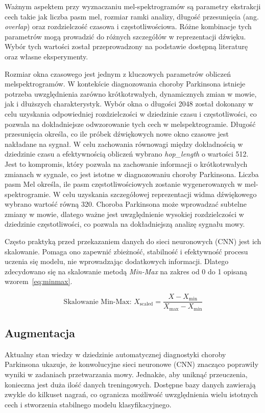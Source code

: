 Ważnym aspektem przy wyznaczaniu mel-spektrogramów są parametry ekstrakcji cech takie jak liczba pasm mel, rozmiar ramki analizy, długość przesunięcia (ang. \emph{overlap}) oraz rozdzielczość czasowa i częstotliwościowa.
Różne kombinacje tych parametrów mogą prowadzić do różnych szczegółów w reprezentacji dźwięku.
Wybór tych wartości został przeprowadzony na podstawie dostępną literaturę oraz własne eksperymenty.

Rozmiar okna czasowego jest jednym z kluczowych parametrów obliczeń melspektrogramów.
W kontekście diagnozowania choroby Parkinsona istnieje potrzeba uwzględnienia zarówno krótkotrwałych, dynamicznych zmian w mowie, jak i dłuższych charakterystyk.
Wybór okna o długości 2048 został dokonany w celu uzyskania odpowiedniej rozdzielczości w dziedzinie czasu i częstotliwości, co pozwala na dokładniejsze odwzorowanie tych cech w melspektrogramie.
Długość przesunięcia określa, co ile próbek dźwiękowych nowe okno czasowe jest nakładane na sygnał.
W celu zachowania równowagi między dokładnością w dziedzinie czasu a efektywnością obliczeń wybrano \emph{hop\_length} o wartości 512.
Jest to kompromis, który pozwala na zachowanie informacji o krótkotrwałych zmianach w sygnale, co jest istotne w diagnozowaniu choroby Parkinsona.
Liczba pasm Mel określa, ile pasm częstotliwościowych zostanie wygenerowanych w mel-spektrogramie.
W celu uzyskania szczegółowej reprezentacji widma dźwiękowego wybrano wartość równą 320.
Choroba Parkinsona może wprowadzać subtelne zmiany w mowie, dlatego ważne jest uwzględnienie wysokiej rozdzielczości w dziedzinie częstotliwości, co pozwala na dokładniejszą analizę sygnału mowy.


Często praktyką przed przekazaniem danych do sieci neuronowych (CNN) jest ich skalowanie.
Pomaga ono zapewnić zbieżność, stabilność i efektywność procesu uczenia się modelu, nie wprowadzając dodatkowych informacji.
Dlatego zdecydowano się na skalowanie metodą \emph{Min-Max}  na zakres od 0 do 1 opisaną wzorem~\eqref{eq:minmax}.

\begin{equation}
	\label{eq:minmax}
	\text{Skalowanie Min-Max: } X_{\text{scaled}} = \frac{X - X_{\min}}{X_{\max} - X_{\min}}
\end{equation}

\subsection{Augmentacja}
\label{subsec:augmentacja}

Aktualny stan wiedzy w dziedzinie automatycznej diagnostyki choroby Parkinsona ukazuje, że konwolucyjne sieci neuronowe (CNN) znacząco poprawiły wyniki w zadaniach przetwarzania mowy.
Jednakże, aby uniknąć przeuczenia, konieczna jest duża ilość danych treningowych.
Dostępne bazy danych zawierają zwykle do kilkuset nagrań, co ogranicza możliwość uwzględnienia wielu istotnych cech i stworzenia stabilnego modelu klasyfikacyjnego.

